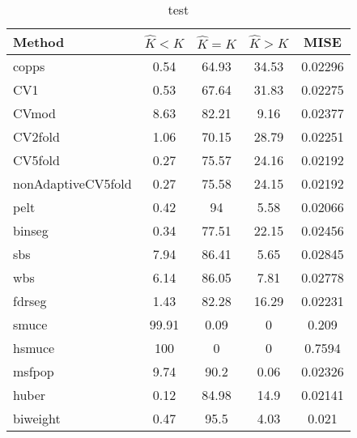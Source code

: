 \begin{table}[ht]
\centering
\begin{tabular}{l|cccc}
  \hline
Method & $\hat{K} < K$ & $\hat{K} = K$ & $\hat{K} > K$ & MISE \\ 
  \hline
copps &  0.54 & 64.93 & 34.53 & 0.02296 \\ 
  CV1 &  0.53 & 67.64 & 31.83 & 0.02275 \\ 
  CVmod &  8.63 & 82.21 &  9.16 & 0.02377 \\ 
  CV2fold &  1.06 & 70.15 & 28.79 & 0.02251 \\ 
  CV5fold &  0.27 & 75.57 & 24.16 & 0.02192 \\ 
  nonAdaptiveCV5fold &  0.27 & 75.58 & 24.15 & 0.02192 \\ 
  pelt &  0.42 &    94 &  5.58 & 0.02066 \\ 
  binseg &  0.34 & 77.51 & 22.15 & 0.02456 \\ 
  sbs &  7.94 & 86.41 &  5.65 & 0.02845 \\ 
  wbs &  6.14 & 86.05 &  7.81 & 0.02778 \\ 
  fdrseg &  1.43 & 82.28 & 16.29 & 0.02231 \\ 
  smuce & 99.91 &  0.09 &     0 & 0.209 \\ 
  hsmuce &   100 &     0 &     0 & 0.7594 \\ 
  msfpop &  9.74 &  90.2 &  0.06 & 0.02326 \\ 
  huber &  0.12 & 84.98 &  14.9 & 0.02141 \\ 
  biweight &  0.47 &  95.5 &  4.03 & 0.021 \\ 
   \hline
\end{tabular}
\caption{test} 
\end{table}
